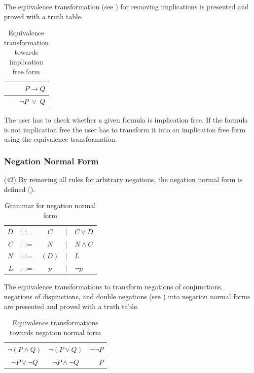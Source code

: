 The equivalence transformation (see ) 
for removing implications is presented
and proved with a truth table. 

\begin{table}[htdp]
\begin{center}
\begin{tabular}{r}
$P \rightarrow Q$ \\ 
\hline
$\neg P \;\vee\; Q$
\end{tabular}
\caption{Equivalence transformation towards implication free form}
\label{tab:ET_IFF}
\end{center}
\end{table}

The user has to check whether a given formula is implication free.
If the formula is not implication free the user has to transform it into an implication free form
using the equivalence transformation.

\subsubsection{Negation Normal Form}
\label{tut:42}

(42)
By removing all  rules for arbitrary negations, the negation normal form is defined
 (). 

\begin{table}[htdp]
\begin{center}
\begin{tabular}{rcccl}
$D$		&$::=$ & $C$ 		&|& 	$C \vee D$\\
$C$		&$::=$ & $N$ 		&|& 	$N \wedge C$ \\
$N$		&$::=$ & $(D)$ 	&|& 	$L$\\
$L$		&$::=$ & $p $ 		&|& 	$\neg p$
\end{tabular}
\caption{Grammar for negation normal form}
\label{tab:BNFGRNNF}
\end{center}
\end{table}

The equivalence transformations to transform negations of conjunctions,
negations of disjunctions, 
and double negations (see )
into negation normal forms are presented 
and proved with a truth table.

\begin{table}[htdp]
\begin{center}
\begin{tabular}{ccr}
$\neg (P \wedge Q) $&$ \neg (P \vee Q)$&$ \neg \neg P$\\
\hline
$\neg P \vee \neg Q$&$\neg P \wedge \neg Q$&$P$
\end{tabular}
\caption{Equivalence transformations towards negation normal form}
\label{tab:ET_NNF}
\end{center}
\end{table}

